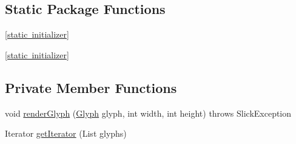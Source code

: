 \subsection*{Static Package Functions}
\begin{DoxyCompactItemize}
\item 
\mbox{\hyperlink{classorg_1_1newdawn_1_1slick_1_1font_1_1_glyph_page_acc727475850f1b225b4dd58b627838d7}{\mbox{[}static initializer\mbox{]}}}
\item 
\mbox{\hyperlink{classorg_1_1newdawn_1_1slick_1_1font_1_1_glyph_page_acc727475850f1b225b4dd58b627838d7}{\mbox{[}static initializer\mbox{]}}}
\end{DoxyCompactItemize}
\subsection*{Private Member Functions}
\begin{DoxyCompactItemize}
\item 
void \mbox{\hyperlink{classorg_1_1newdawn_1_1slick_1_1font_1_1_glyph_page_ab2f0b2c9a31ae9402ab7a0575fb855c0}{render\+Glyph}} (\mbox{\hyperlink{classorg_1_1newdawn_1_1slick_1_1font_1_1_glyph}{Glyph}} glyph, int width, int height)  throws Slick\+Exception 
\item 
Iterator \mbox{\hyperlink{classorg_1_1newdawn_1_1slick_1_1font_1_1_glyph_page_a7803412d2be72ebd03d1dee29f571770}{get\+Iterator}} (List glyphs)
\end{DoxyCompactItemize}
